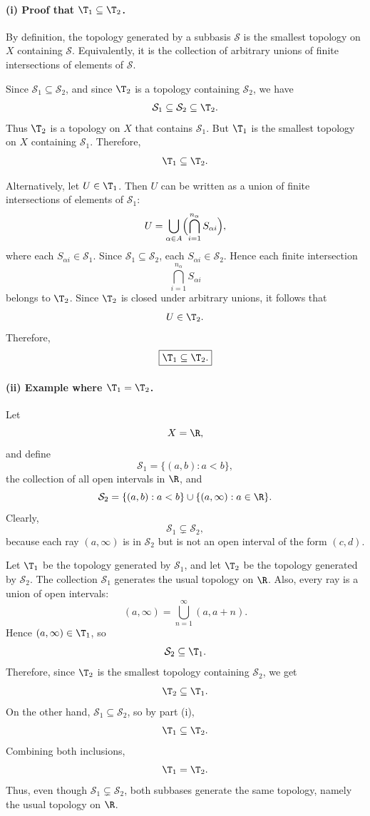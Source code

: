 \paragraph{(i) Proof that $\T_1\subseteq\T_2$.} By definition, the topology generated by a
subbasis $\mathcal{S}$ is the smallest topology on $X$ containing $\mathcal{S}$. Equivalently,
it is the collection of arbitrary unions of finite intersections of elements of $\mathcal{S}$.

Since $\mathcal{S}_1\subseteq\mathcal{S}_2$, and since $\T_2$ is a topology containing
$\mathcal{S}_2$, we have
\[ \mathcal{S}_1\subseteq\mathcal{S}_2\subseteq\T_2. \]
Thus $\T_2$ is a topology on $X$ that contains $\mathcal{S}_1$. But $\T_1$ is the smallest
topology on $X$ containing $\mathcal{S}_1$. Therefore,
\[ \T_1\subseteq\T_2. \]

Alternatively, let $U\in\T_1$. Then $U$ can be written as a union of finite intersections of
elements of $\mathcal{S}_1$:
\[ U=\bigcup_{\alpha\in A}\Bigl(\bigcap_{i=1}^{n_\alpha}S_{\alpha i}\Bigr), \]
where each $S_{\alpha i}\in\mathcal{S}_1$. Since $\mathcal{S}_1\subseteq\mathcal{S}_2$, each
$S_{\alpha i}\in\mathcal{S}_2$. Hence each finite intersection
\[ \bigcap_{i=1}^{n_\alpha}S_{\alpha i} \]
belongs to $\T_2$. Since $\T_2$ is closed under arbitrary unions, it follows that
\[ U\in\T_2. \]
Therefore,
\[ \boxed{\T_1\subseteq\T_2.} \]

\paragraph{(ii) Example where $\T_1=\T_2$.} Let
\[ X=\R, \]
and define
\[ \mathcal{S}_1=\{(a,b) : a<b\}, \]
the collection of all open intervals in $\R$, and
\[ \mathcal{S}_2=\{(a,b) : a<b\}\cup\{(a,\infty) : a\in\R\}. \]
Clearly,
\[ \mathcal{S}_1\subsetneq\mathcal{S}_2, \]
because each ray $(a,\infty)$ is in $\mathcal{S}_2$ but is not an open interval of the form
$(c,d)$.

Let $\T_1$ be the topology generated by $\mathcal{S}_1$, and let $\T_2$ be the topology
generated by $\mathcal{S}_2$. The collection $\mathcal{S}_1$ generates the usual topology on
$\R$. Also, every ray is a union of open intervals:
\[ (a,\infty)=\bigcup_{n=1}^{\infty}(a,a+n). \]
Hence $(a,\infty)\in\T_1$, so
\[ \mathcal{S}_2\subseteq\T_1. \]
Therefore, since $\T_2$ is the smallest topology containing $\mathcal{S}_2$, we get
\[ \T_2\subseteq\T_1. \]
On the other hand, $\mathcal{S}_1\subseteq\mathcal{S}_2$, so by part (i),
\[ \T_1\subseteq\T_2. \]
Combining both inclusions,
\[ \T_1=\T_2. \]
Thus, even though $\mathcal{S}_1\subsetneq\mathcal{S}_2$, both subbases generate the same
topology, namely the usual topology on $\R$.
